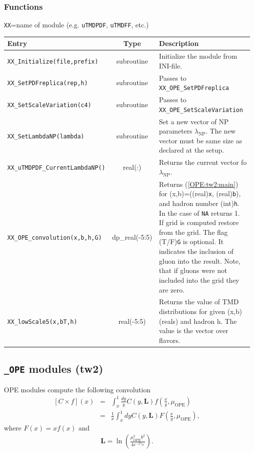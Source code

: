 \documentclass[prd,nofootinbib,eqsecnum,final]{revtex4}
\renewcommand{\(}{\left(}
\renewcommand{\)}{\right)}
\renewcommand{\[}{\left[}
\renewcommand{\]}{\right]}
\begin{document}
\subsubsection{Functions}

\begin{center}
\texttt{XX}=name of module (e.g. \texttt{uTMDPDF}, \texttt{uTMDFF}, etc.)
\\
\begin{tabular}{||p{5.5cm}||c||p{8.5cm}||}
\hline\hline
Entry &~~Type~~& Description
\\\hline
\texttt{XX\_Initialize(file,prefix)} & subroutine & Initialize the module from INI-file.
\\\hline
\texttt{XX\_SetPDFreplica(rep,h)} & subroutine & Passes to \texttt{XX\_OPE\_SetPDFreplica}
\\\hline
\texttt{XX\_SetScaleVariation(c4)} & subroutine & Passes to \texttt{XX\_OPE\_SetScaleVariation}
\\\hline
\texttt{XX\_SetLambdaNP(lambda)} & subroutine & Set a new vector of NP parameters $\lambda_{\text{NP}}$. The new vector must be same size as declared at the setup.
\\\hline
\texttt{XX\_uTMDPDF_CurrentLambdaNP()} & real(:) & Returns the current vector fo $\lambda_{\text{NP}}$.
\\\hline\hline
\texttt{XX\_OPE\_convolution(x,b,h,G)} & dp\_real(-5:5) & Returns (\ref{OPE:tw2:main}) for (x,b)=((real)\texttt{x}, (real)\texttt{b}), and hadron number (int)\texttt{h}. In the case of \texttt{NA} returns 1. If grid is computed restore from the grid. The flag (T/F)\texttt{G} is optional. It indicates the inclusion of gluon into the result. Note, that if gluons were not included into the grid they are zero.
\\\hline\hline
\texttt{XX\_lowScale5(x,bT,h)} & real(-5:5) & Returns the value of TMD distributions for given (x,b) (reals) and hadron h. The value is the vector over flavors.
\end{tabular}
\end{center}

\subsection{\texttt{\_OPE} modules (tw2)}
\label{TMD_OPE}

OPE modules compute the following convolution
\begin{eqnarray}\label{OPE:tw2:main}
[C\times f](x)&=&\int_x^1 \frac{dy}{y} C(y,\mathbf{L})f\(\frac{x}{y},\mu_{\text{OPE}}\)
\\
&=&
\frac{1}{x}\int_x^1 dy C(y,\mathbf{L})F\(\frac{x}{y},\mu_{\text{OPE}}\),
\end{eqnarray}
where $F(x)=xf(x)$ and 
\begin{eqnarray}
\mathbf{L}=\ln\(\frac{\mu^2_{\text{OPE}}b^2}{4e^{-2\gamma_E}}\).
\end{eqnarray}
\end{document}
